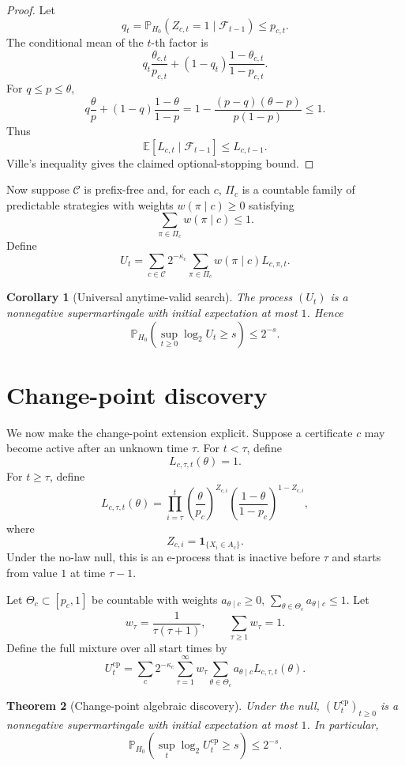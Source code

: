 \documentclass[11pt]{article}
\newtheorem{theorem}{Theorem}[section]
\newtheorem{corollary}[theorem]{Corollary}
\begin{document}
\begin{proof}
Let
\[
q_t=\mathbb P_{H_0}(Z_{c,t}=1\mid\mathcal F_{t-1})
\le p_{c,t}.
\]
The conditional mean of the $t$-th factor is
\[
q_t\frac{\theta_{c,t}}{p_{c,t}}
+
(1-q_t)\frac{1-\theta_{c,t}}{1-p_{c,t}}.
\]
For $q\le p\le \theta$,
\[
q\frac{\theta}{p}
+
(1-q)\frac{1-\theta}{1-p}
=
1-\frac{(p-q)(\theta-p)}{p(1-p)}
\le1.
\]
Thus
\[
\mathbb E[L_{c,t}\mid\mathcal F_{t-1}]
\le L_{c,t-1}.
\]
Ville's inequality gives the claimed optional-stopping bound.
\end{proof}

Now suppose $\mathcal C$ is prefix-free and, for each $c$, $\Pi_c$ is a countable family of predictable strategies with weights $w(\pi\mid c)\ge0$ satisfying
\[
\sum_{\pi\in\Pi_c}w(\pi\mid c)\le1.
\]
Define
\[
U_t=
\sum_{c\in\mathcal C}2^{-\kappa_c}
\sum_{\pi\in\Pi_c}w(\pi\mid c)L_{c,\pi,t}.
\]

\begin{corollary}[Universal anytime-valid search]
The process $(U_t)$ is a nonnegative supermartingale with initial expectation at most $1$. Hence
\[
\mathbb P_{H_0}\left(\sup_{t\ge0}\log_2 U_t\ge s\right)\le2^{-s}.
\]
\end{corollary}

\section{Change-point discovery}

We now make the change-point extension explicit. Suppose a certificate $c$ may become active after an unknown time $\tau$. For $t<\tau$, define
\[
L_{c,\tau,t}(\theta)=1.
\]
For $t\ge\tau$, define
\[
L_{c,\tau,t}(\theta)
=
\prod_{i=\tau}^{t}
\left(\frac{\theta}{p_c}\right)^{Z_{c,i}}
\left(\frac{1-\theta}{1-p_c}\right)^{1-Z_{c,i}},
\]
where
\[
Z_{c,i}=\mathbf 1_{\{X_i\in A_c\}}.
\]
Under the no-law null, this is an e-process that is inactive before $\tau$ and starts from value $1$ at time $\tau-1$.

Let $\Theta_c\subset[p_c,1]$ be countable with weights $a_{\theta\mid c}\ge0$, $\sum_{\theta\in\Theta_c}a_{\theta\mid c}\le1$. Let
\[
w_\tau=\frac1{\tau(\tau+1)},
\qquad
\sum_{\tau\ge1}w_\tau=1.
\]
Define the full mixture over all start times by
\[
U_t^{\mathrm{cp}}
=
\sum_c2^{-\kappa_c}
\sum_{\tau=1}^{\infty}w_\tau
\sum_{\theta\in\Theta_c}a_{\theta\mid c}L_{c,\tau,t}(\theta).
\]

\begin{theorem}[Change-point algebraic discovery]
Under the null, $(U_t^{\mathrm{cp}})_{t\ge0}$ is a nonnegative supermartingale with initial expectation at most $1$. In particular,
\[
\mathbb P_{H_0}\left(\sup_t\log_2U_t^{\mathrm{cp}}\ge s\right)\le2^{-s}.
\]
\end{theorem}
\end{document}
